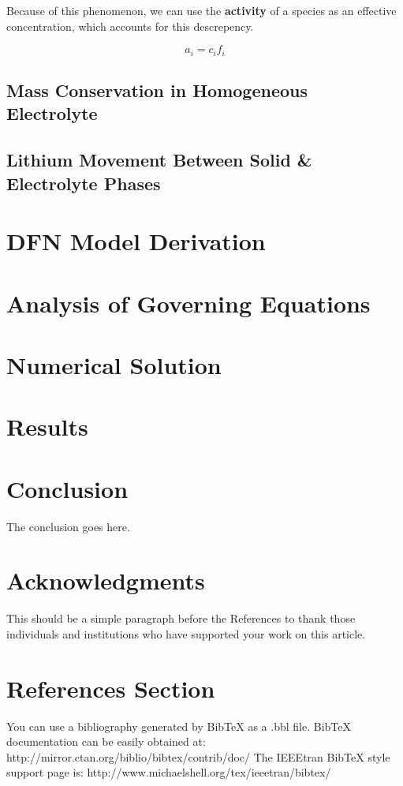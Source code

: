 \documentclass[lettersize,journal]{IEEEtran}
\begin{document}
Because of this phenomenon, we can use the \textbf{activity} of a species as an effective concentration, which accounts for this descrepency.

\[
    a_i = c_i f_i
\]










\subsection{Mass Conservation in Homogeneous Electrolyte}
\subsection{Lithium Movement Between Solid \& Electrolyte Phases}


\section{DFN Model Derivation}



\section{Analysis of Governing Equations}

\section{Numerical Solution}

\section{Results}

\section{Conclusion}
The conclusion goes here.


\section*{Acknowledgments}
This should be a simple paragraph before the References to thank those individuals and institutions who have supported your work on this article.

\section{References Section}
You can use a bibliography generated by BibTeX as a .bbl file.
 BibTeX documentation can be easily obtained at:
 http://mirror.ctan.org/biblio/bibtex/contrib/doc/
 The IEEEtran BibTeX style support page is:
 http://www.michaelshell.org/tex/ieeetran/bibtex/
\end{document}

